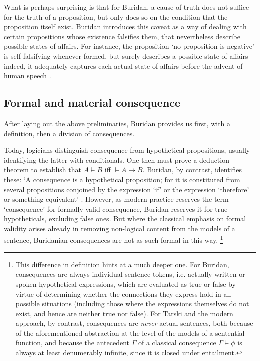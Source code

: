 \documentclass[]{article}
\begin{document}
What is perhaps surprising is that for Buridan, a cause of truth does not suffice for the truth of a proposition, but only does so on the condition that the proposition itself exist. Buridan introduces this caveat as a way of dealing with certain propositions whose existence falsifies them, that nevertheless describe possible states of affairs. For instance, the proposition `no proposition is negative' is self-falsifying whenever formed, but surely describes a possible state of affairs - indeed, it adequately captures each actual state of affairs before the advent of human speech \cite[TC I. 3]{Buridan2015}.
\subsection{Formal and material consequence}
After laying out the above preliminaries, Buridan provides us first, with a definition, then a division of consequences.

Today, logicians distinguish consequence from hypothetical propositions, usually identifying the latter with conditionals. One then must prove a deduction theorem to establish that $A \models B$ iff $\models A \rightarrow B$. Buridan, by contrast, identifies these: `A consequence is a hypothetical proposition; for it is constituted from several propositions conjoined by the expression `if' or the expression `therefore' or something equivalent' \cite[TC I. 3, 6, alt.]{Buridan2015}. However, as modern practice reserves the term `consequence' for formally valid consequence, Buridan reserves it for true hypotheticals, excluding false ones\cite[TC I. 3, 66]{Buridan2015}. But where the classical emphasis on formal validity arises already in removing non-logical content from the models of a sentence, Buridanian consequences are not as such formal in this way. \footnote{This difference in definition hints at a much deeper one. For Buridan, consequences are always individual sentence tokens, i.e. actually written or spoken hypothetical expressions, which are evaluated as true or false by virtue of determining whether the connections they express hold in all possible situations (including those where the expressions themselves do not exist, and hence are neither true nor false). For Tarski and the modern approach, by contrast, consequences are \textit{never} actual sentences, both because of the aforementioned abstraction at the level of the models of a sentential function, and because the antecedent $\Gamma$ of a classical consequence $\Gamma \models \phi$ is always at least denumerably infinite, since it is closed under entailment.}
\end{document}
